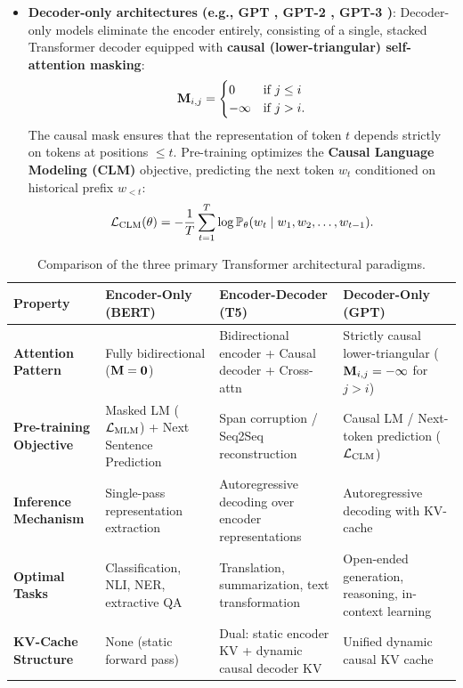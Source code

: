 \documentclass[../../main.tex]{subfiles}
\begin{document}
\begin{itemize}
    \item \textbf{Decoder-only architectures (e.g., GPT \cite{radford2018}, GPT-2 \cite{radford2019}, GPT-3 \cite{brown2020})}:
    Decoder-only models eliminate the encoder entirely, consisting of a single, stacked Transformer decoder equipped with \textbf{causal (lower-triangular) self-attention masking}:
    \begin{equation}
    \label{eq:causal_mask_matrix}
    \mathbf{M}_{i,j} = \begin{cases} 0 & \text{if } j \le i \\ -\infty & \text{if } j > i. \end{cases}
    \end{equation}
    The causal mask ensures that the representation of token $t$ depends strictly on tokens at positions $\le t$. Pre-training optimizes the \textbf{Causal Language Modeling (CLM)} objective, predicting the next token $w_t$ conditioned on historical prefix $w_{<t}$:
    \begin{equation}
    \label{eq:clm_objective_formal}
    \mathcal{L}_{\text{CLM}}(\theta) = -\frac{1}{T} \sum_{t=1}^T \log \mathbb{P}_\theta(w_t \mid w_1, w_2, \dots, w_{t-1}).
    \end{equation}
\end{itemize}

\begin{table}[htbp]
\centering
\small
\caption{Comparison of the three primary Transformer architectural paradigms.}
\label{tab:transformer_architectural_comparison}
\begin{tabularx}{\textwidth}{lXXX}
\toprule
\textbf{Property} & \textbf{Encoder-Only (BERT)} & \textbf{Encoder-Decoder (T5)} & \textbf{Decoder-Only (GPT)} \\
\midrule
\textbf{Attention Pattern} & Fully bidirectional ($\mathbf{M} = \mathbf{0}$) & Bidirectional encoder + Causal decoder + Cross-attn & Strictly causal lower-triangular ($\mathbf{M}_{i,j} = -\infty$ for $j > i$) \\
\addlinespace[3pt]
\textbf{Pre-training Objective} & Masked LM ($\mathcal{L}_{\text{MLM}}$) + Next Sentence Prediction & Span corruption / Seq2Seq reconstruction & Causal LM / Next-token prediction ($\mathcal{L}_{\text{CLM}}$) \\
\addlinespace[3pt]
\textbf{Inference Mechanism} & Single-pass representation extraction & Autoregressive decoding over encoder representations & Autoregressive decoding with KV-cache \\
\addlinespace[3pt]
\textbf{Optimal Tasks} & Classification, NLI, NER, extractive QA & Translation, summarization, text transformation & Open-ended generation, reasoning, in-context learning \\
\addlinespace[3pt]
\textbf{KV-Cache Structure} & None (static forward pass) & Dual: static encoder KV + dynamic causal decoder KV & Unified dynamic causal KV cache \\
\bottomrule
\end{tabularx}
\end{table}
\end{document}
